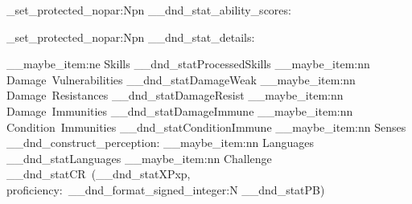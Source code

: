 \cs_set_protected_nopar:Npn \__dnd_stat_ability_scores:
{
	\color {StatblockHeading}
	\setlength\topsep{0pt}
	\setlength\tabcolsep{3pt}

	\begin{center}
	\end{center}
	\par \vspace{0.1cm}
}
\cs_set_protected_nopar:Npn \__dnd_stat_details:
{
	\begin {description}[
		before   = \color {StatblockHeading},
		font     = \RpgFontStatBlockBody\color {StatblockHeading},
		labelsep = \__rpg_SpaceDim,
		nosep]

	\__maybe_item:ne {Skills}					{\__dnd_statProcessedSkills} %
	\__maybe_item:nn {Damage~Vulnerabilities}	{\__dnd_statDamageWeak}
	\__maybe_item:nn {Damage~Resistances}		{\__dnd_statDamageResist}
	\__maybe_item:nn {Damage~Immunities}		{\__dnd_statDamageImmune}
	\__maybe_item:nn {Condition~Immunities}		{\__dnd_statConditionImmune}
	\__maybe_item:nn {Senses}					{\__dnd_construct_perception:}
	\__maybe_item:nn {Languages}				{\__dnd_statLanguages}
	\__maybe_item:nn {Challenge}				{\__dnd_statCR{}~(\__dnd_statXP{}xp,~ proficiency:~\__dnd_format_signed_integer:N {\__dnd_statPB})}
	\end {description}
}

\DeclareDocumentCommand {\RpgStatLine} {}
{
	\par \vspace{-2pt} \noindent
	\par
}

